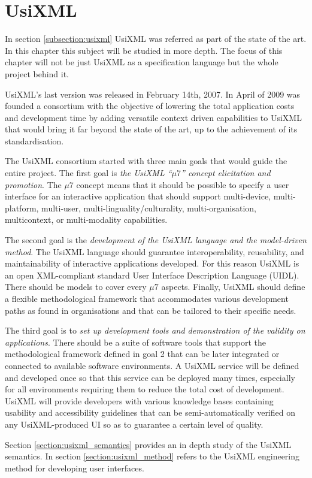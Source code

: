 \chapter{UsiXML}

In section \ref{subsection:usixml} UsiXML was referred as part of the state of the art. In this chapter this subject will be studied in more depth. The focus of this chapter will not be just UsiXML as a specification language but the whole project behind it.

UsiXML's last version was released in February 14th, 2007. In April of 2009 was founded a consortium with the objective of lowering  the total application costs and development time by adding versatile context driven capabilities to UsiXML that would bring it far beyond the state of the art, up to the achievement of its standardisation.

The UsiXML consortium started with three main goals that would guide the entire project. The first goal is \textit{the UsiXML ``$\mu7$'' concept elicitation and promotion}. The $\mu7$ concept means that it should be possible to specify  a user interface for an interactive application that should support multi-device, multi-platform, multi-user, multi-linguality/culturality, multi-organisation, multicontext, or multi-modality capabilities.

The second goal is the \textit{development of the UsiXML language and the model-driven method}. The UsiXML language should guarantee interoperability, reusability, and maintainability of interactive applications developed. For this reason UsiXML is an open XML-compliant standard User Interface Description Language (UIDL). There should be models to cover every $\mu7$ aspects. Finally, UsiXML should define a flexible methodological framework that accommodates various development paths as found in organisations and that can be tailored to their specific needs.

The third goal is to \textit{set up development tools and demonstration of the validity on applications}. There should be a suite of software tools that support the methodological framework defined in goal 2 that can be later integrated or connected to available software environments. A UsiXML service will be defined and developed once so that this service can be deployed many times, especially for all environments requiring them to reduce the total cost of development. UsiXML will provide developers with various knowledge bases containing usability and accessibility guidelines that can be semi-automatically verified on any UsiXML-produced UI so as to guarantee a certain level of quality.

Section \ref{section:usixml_semantics} provides an in depth study of the UsiXML semantics. In section \ref{section:usixml_method} refers to the UsiXML engineering method for developing user interfaces.


